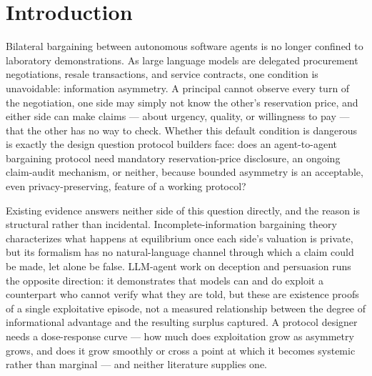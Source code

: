 \documentclass[11pt]{article}
\begin{document}
\section{Introduction}

Bilateral bargaining between autonomous software agents is no longer confined to laboratory demonstrations. As large language models are delegated procurement negotiations, resale transactions, and service contracts, one condition is unavoidable: information asymmetry. A principal cannot observe every turn of the negotiation, one side may simply not know the other's reservation price, and either side can make claims --- about urgency, quality, or willingness to pay --- that the other has no way to check. Whether this default condition is dangerous is exactly the design question protocol builders face: does an agent-to-agent bargaining protocol need mandatory reservation-price disclosure, an ongoing claim-audit mechanism, or neither, because bounded asymmetry is an acceptable, even privacy-preserving, feature of a working protocol?

Existing evidence answers neither side of this question directly, and the reason is structural rather than incidental. Incomplete-information bargaining theory characterizes what happens at equilibrium once each side's valuation is private, but its formalism has no natural-language channel through which a claim could be made, let alone be false. LLM-agent work on deception and persuasion runs the opposite direction: it demonstrates that models can and do exploit a counterpart who cannot verify what they are told, but these are existence proofs of a single exploitative episode, not a measured relationship between the degree of informational advantage and the resulting surplus captured. A protocol designer needs a dose-response curve --- how much does exploitation grow as asymmetry grows, and does it grow smoothly or cross a point at which it becomes systemic rather than marginal --- and neither literature supplies one.
\end{document}

